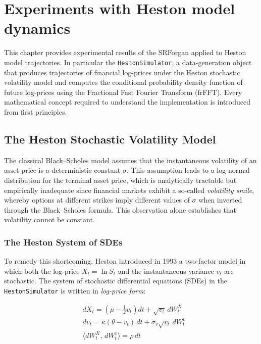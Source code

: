 \chapter{Experiments with Heston model dynamics}
\label{chap:heston}

This chapter provides experimental results  of the SRForgan applied to Heston model trajectories. 
In particular the \texttt{HestonSimulator}, a data-generation object that produces trajectories of financial log-prices under the Heston stochastic volatility model and computes the conditional probability density function of future log-prices using the Fractional Fast Fourier Transform (frFFT).
Every mathematical concept required to understand the implementation is introduced from first principles.

\section{The Heston Stochastic Volatility Model}
\label{sec:heston_model}

The classical Black--Scholes model assumes that the instantaneous volatility of an asset price is a deterministic constant $\sigma$.
This assumption leads to a log-normal distribution for the terminal asset price, which is analytically tractable but empirically inadequate since financial markets exhibit a so-called
\textit{volatility smile}, whereby options at different strikes imply different values of $\sigma$ 
when inverted through the Black--Scholes formula. 
This observation alone establishes that volatility cannot be constant.

\subsection{The Heston System of SDEs}

To remedy this shortcoming, Heston \cite{heston:heston_paper} introduced in 1993 a two-factor model in which both the log-price $X_t = \ln S_t$ and the instantaneous variance $v_t$ are stochastic.
The system of stochastic differential equations (SDEs) in the \texttt{HestonSimulator} is written in \textit{log-price form}:

\begin{align}
    &dX_t = \left(\mu - \tfrac{1}{2}v_t\right)dt + \sqrt{v_t}\, dW_t^X \label{eq:logprice_sde_heston}\\
    &dv_t = \kappa(\theta - v_t)\,dt + \sigma_v\sqrt{v_t}\, dW_t^v \label{eq:var_sde_heston}\\
    &\langle dW_t^X,\, dW_t^v \rangle = \rho\, dt \label{eq:correlation_heston}
\end{align}

